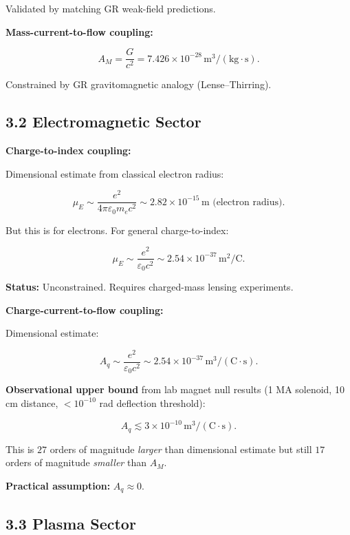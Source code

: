 \documentclass{article}
\begin{document}
Validated by matching GR weak-field predictions.

\textbf{Mass-current-to-flow coupling:}



\[
A_M = \frac{G}{c^2} = 7.426 \times 10^{-28}\,\text{m}^3/(\text{kg}\cdot\text{s}).
\]



Constrained by GR gravitomagnetic analogy (Lense--Thirring).

\subsection*{3.2 Electromagnetic Sector}

\textbf{Charge-to-index coupling:}

Dimensional estimate from classical electron radius:



\[
\mu_E \sim \frac{e^2}{4\pi\varepsilon_0 m_e c^2}
\sim 2.82 \times 10^{-15}\,\text{m (electron radius)}.
\]



But this is for electrons. For general charge-to-index:



\[
\mu_E \sim \frac{e^2}{\varepsilon_0 c^2}
\sim 2.54 \times 10^{-37}\,\text{m}^2/\text{C}.
\]



\textbf{Status:} Unconstrained. Requires charged-mass lensing experiments.

\textbf{Charge-current-to-flow coupling:}

Dimensional estimate:



\[
A_q \sim \frac{e^2}{\varepsilon_0 c^2}
\sim 2.54 \times 10^{-37}\,\text{m}^3/(\text{C}\cdot\text{s}).
\]



\textbf{Observational upper bound} from lab magnet null results (1 MA solenoid,
10 cm distance, $< 10^{-10}$ rad deflection threshold):



\[
A_q \lesssim 3 \times 10^{-10}\,\text{m}^3/(\text{C}\cdot\text{s}).
\]



This is $27$ orders of magnitude \emph{larger} than dimensional estimate but
still $17$ orders of magnitude \emph{smaller} than $A_M$.

\textbf{Practical assumption:} $A_q \approx 0$.

\subsection*{3.3 Plasma Sector}
\end{document}
